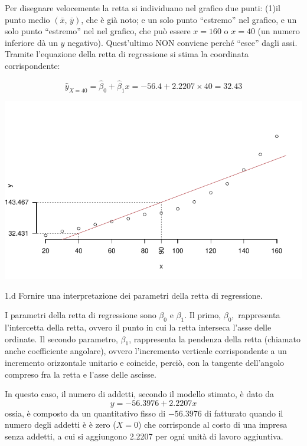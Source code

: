 \documentclass[
  11pt,
]{book}
\theoremstyle{mytheoremstyle}
\theoremstyle{mydefstyle}
\newenvironment{sol}
  {
  \begin{tcolorbox}[enhanced,breakable,arc=0.1mm,boxrule=1pt,colback=white,colframe=iblue,
  title=\bf \fontfamily{lmss}\selectfont \hspace{.5 cm} Soluzione,drop fuzzy shadow]

}{
\end{tcolorbox}
  }
\begin{document}
\begin{sol}

Per disegnare velocemente la retta si individuano nel grafico
due punti: (1)il punto medio \((\bar{x},\, \bar{y})\), che è già
noto; e un solo punto ``estremo'' nel grafico, e un solo punto ``estremo'' nel
nel grafico, che può essere \(x=160\)
o \(x=40\) (un numero inferiore dà un \(y\) negativo).
Quest'ultimo NON conviene perché ``esce'' dagli assi.
Tramite l'equazione della retta di regressione si stima la coordinata
corrispondente:

\[\hat y_{X= 40 }=\hat\beta_0+\hat\beta_1 x= -56.4 + 2.2207 \times 40 = 32.43 \]

\begin{center}\includegraphics{Esami_passati_con_soluzioni_files/figure-latex/06-regr-56-1} \end{center}

\end{sol}

1.d Fornire una interpretazione dei parametri della retta di regressione.

\begin{sol}
I parametri della retta di regressione sono \(\beta_{0}\) e \(\beta_{1}\).
Il primo, \(\beta_{0},\) rappresenta l'intercetta della retta,
ovvero il punto in cui la retta interseca l'asse delle ordinate.
Il secondo parametro, \(\beta_{1}\), rappresenta la pendenza della
retta (chiamato anche coefficiente angolare), ovvero l'incremento
verticale corrispondente a un incremento orizzontale unitario e
coincide, perciò, con la tangente dell'angolo compreso fra la
retta e l'asse delle ascisse.

In questo caso, il numero di addetti, secondo il modello stimato,
è dato da
\[y= -56.3976 + 2.2207 x\]
ossia, è composto da un quantitativo fisso di \(-56.3976\)
di fatturato quando il numero degli addetti è è zero (\(X=0\))
che corrisponde al costo di una impresa senza addetti, a cui
si aggiungono 2.2207 per ogni unità di lavoro aggiuntiva.

\end{sol}
\end{document}
